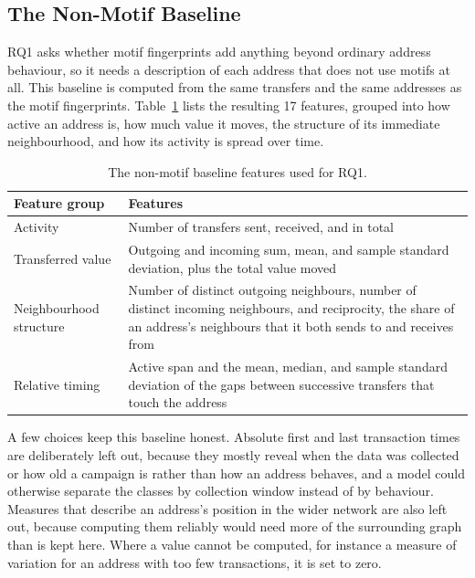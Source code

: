 \documentclass{thesisclass}
\begin{document}
\subsection{The Non-Motif Baseline}

RQ1 asks whether motif fingerprints add anything beyond ordinary address behaviour, so it
needs a description of each address that does not use motifs at all. This
baseline is computed from the same transfers and the same addresses as the motif
fingerprints. Table~\ref{tab:results_baseline_features} lists the resulting 17
features, grouped into how active an address is, how much value it moves, the
structure of its immediate neighbourhood, and how its activity is spread over
time.

\begin{table}[ht]
\centering
\caption{The non-motif baseline features used for RQ1.}
\label{tab:results_baseline_features}
\small
\begin{tabular}{@{}p{3.4cm} p{9.5cm}@{}}
\toprule
\textbf{Feature group} & \textbf{Features} \\
\midrule
Activity &
Number of transfers sent, received, and in total \\[2pt]
Transferred value &
Outgoing and incoming sum, mean, and sample standard deviation, plus the total
value moved \\[2pt]
Neighbourhood structure &
Number of distinct outgoing neighbours, number of distinct incoming neighbours,
and reciprocity, the share of an address's neighbours that it both sends to and
receives from \\[2pt]
Relative timing &
Active span and the mean, median, and sample standard deviation of the gaps
between successive transfers that touch the address \\
\bottomrule
\end{tabular}
\end{table}

A few choices keep this baseline honest. Absolute first and last transaction
times are deliberately left out, because they mostly reveal when the data was
collected or how old a campaign is rather than how an address behaves, and a
model could otherwise separate the classes by collection window instead of by
behaviour. Measures that describe an address's position in the wider network are also left
out, because computing them reliably would need more of the surrounding graph
than is kept here. Where a value cannot be computed, for instance a measure of
variation for an address with too few transactions, it is set to zero.
\end{document}
